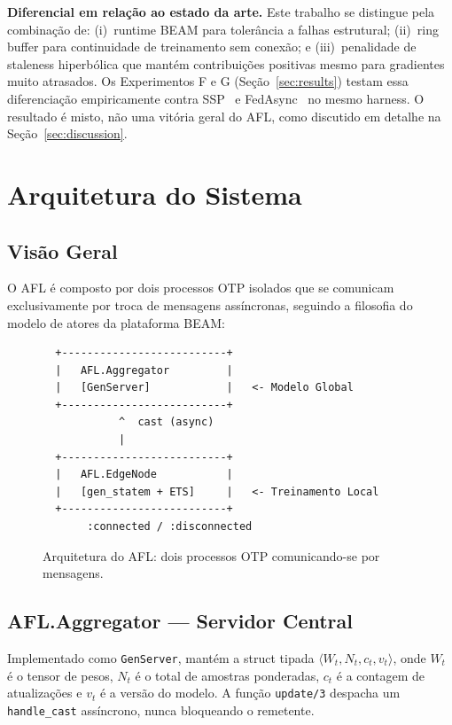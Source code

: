 \documentclass[conference,a4paper]{IEEEtran}
\begin{document}
\textbf{Diferencial em relação ao estado da arte.}
Este trabalho se distingue pela combinação de: (i)~runtime BEAM para
tolerância a falhas estrutural; (ii)~ring buffer para continuidade de
treinamento sem conexão; e (iii)~penalidade de staleness hiperbólica que
mantém contribuições positivas mesmo para gradientes muito atrasados. Os
Experimentos F e G (Seção~\ref{sec:results}) testam essa diferenciação
empiricamente contra SSP~\cite{ho2013} e FedAsync~\cite{xie2019} no mesmo
harness. O resultado é misto, não uma vitória geral do AFL, como discutido em
detalhe na Seção~\ref{sec:discussion}.

\section{Arquitetura do Sistema}
\label{sec:arch}

\subsection{Visão Geral}

O AFL é composto por dois processos OTP isolados que se comunicam
exclusivamente por troca de mensagens assíncronas, seguindo a filosofia do
modelo de atores da plataforma BEAM:

\begin{figure}[H]
\centering
\begin{minipage}{0.9\linewidth}
\small
\begin{verbatim}
  +--------------------------+
  |   AFL.Aggregator         |
  |   [GenServer]            |   <- Modelo Global
  +--------------------------+
            ^  cast (async)
            |
  +--------------------------+
  |   AFL.EdgeNode           |
  |   [gen_statem + ETS]     |   <- Treinamento Local
  +--------------------------+
       :connected / :disconnected
\end{verbatim}
\end{minipage}
\caption{Arquitetura do AFL: dois processos OTP comunicando-se por mensagens.}
\label{fig:arch}
\end{figure}

\subsection{AFL.Aggregator --- Servidor Central}

Implementado como \texttt{GenServer}, mantém a struct tipada
$\langle W_t, N_t, c_t, v_t \rangle$, onde $W_t$ é o tensor de pesos,
$N_t$ é o total de amostras ponderadas, $c_t$ é a contagem de atualizações
e $v_t$ é a versão do modelo. A função \texttt{update/3} despacha um
\texttt{handle\_cast} assíncrono, nunca bloqueando o remetente.
\end{document}
